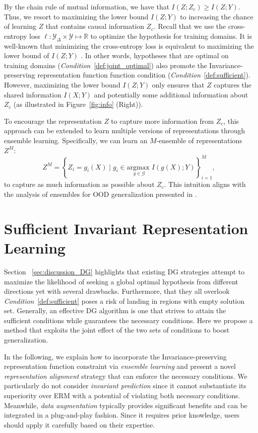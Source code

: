By the chain rule of mutual information, we have that $I(Z; Z_c) \ge I(Z; Y)$. Thus, we resort to maximizing the lower bound $I(Z; Y)$ to increasing the chance of learning $Z$ that contains causal information $Z_c$. 
Recall that we use the cross-entropy loss \(\ell:\mathcal{Y}_{\Delta} \times \mathcal{Y} \mapsto \mathbb{R}\) to optimize the hypothesis for training domains. It is well-known that minimizing the cross-entropy loss is equivalent to maximizing the lower bound of \(I(Z; Y)\) \citep{qin2019rethinking, colombo2021novel}. In other words, hypotheses that are optimal on training domains (\textit{Condition}~\ref{def:joint_optimal}) also promote the Invariance-preserving representation function function condition (\textit{Condition}~\ref{def:sufficient}). However, maximizing the lower bound \(I(Z; Y)\) only ensures that \(Z\) captures the shared information \(I(X; Y)\) and potentially some additional information about \(Z_c\) (as illustrated in Figure~\ref{fig:info} (Right)).

To encourage the representation \(Z\) to capture more information from \(Z_c\), this approach can be extended to learn multiple versions of representations through ensemble learning. Specifically, we can learn an \(M\)-ensemble of representations \(Z^M\):
\[
Z^M = \left\{Z_i = g_i(X) \mid g_i \in \underset{g\in \mathcal{G}}{\text{argmax }} I(g(X); Y) \right\}_{i=1}^{M},
\]
to capture as much information as possible about \(Z_c\). This intuition aligns with the analysis of ensembles for OOD generalization presented in \cite{rame2022diverse}.



\section{Sufficient Invariant Representation Learning}
\label{sec:main_proposed_method}

Section ~\ref{sec:discussion_DG} highlights that existing DG strategies attempt to maximize the likelihood of seeking a global optimal hypothesis from different directions yet with several drawbacks. Furthermore, that they all overlook \textit{Condition}~\ref{def:sufficient} poses a risk of landing in regions with empty solution set. Generally, an effective DG algorithm is one that strives to attain the sufficient conditions while guarantees the necessary conditions. Here we propose a method that exploits the joint effect of the two sets of conditions to boost generalization. 

In the following, we explain how to incorporate the Invariance-preserving representation function constraint via \textit{ensemble learning} and present a novel \textit{representation alignment} strategy that can enforce the necessary conditions. We particularly do not consider \textit{invariant prediction} since it cannot substantiate its superiority over ERM with a potential of violating both necessary conditions. Meanwhile, \textit{data augmentation} typically provides significant benefits and can be integrated in a plug-and-play fashion. Since it requires prior knowledge, users should apply it carefully based on their expertise. 

